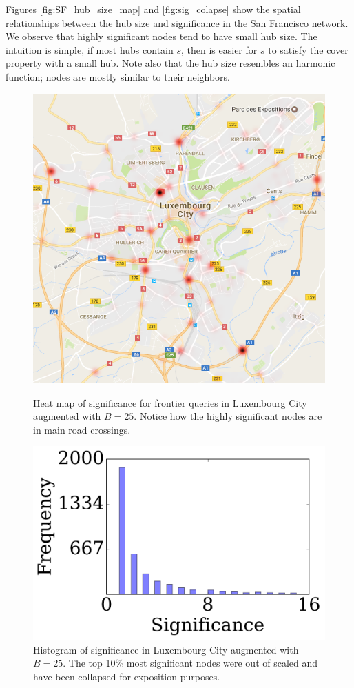 Figures \ref{fig:SF_hub_size_map} and \ref{fig:sig_colapse} show the spatial relationships between the hub size and significance in the San Francisco network. 
We observe that highly significant nodes tend to have small hub size.
The intuition is simple, if most hubs contain $s$, then is easier for $s$ to satisfy the cover property with a small hub.
Note also that the hub size resembles an harmonic function; nodes are mostly similar to their neighbors.

\begin{figure}
\begin{minipage}[t]{.53\textwidth}
\centering
\includegraphics[scale=0.3]{TexImg/map_LU_sig.png}
\caption{Heat map of significance for frontier queries in Luxembourg City augmented with $B=25$.
Notice how the highly significant nodes are in main road crossings.}
\label{fig:map_LU} 
\end{minipage}
\hfil
\begin{minipage}[t]{.43\textwidth}
\includegraphics[scale=0.35]{TexImg/significance_LU.pdf}
\caption{Histogram of significance in Luxembourg City augmented with $B=25$.
The top 10\% most significant nodes were out of scaled and have been collapsed for exposition purposes.}
\label{fig:sig_LU} 
\end{minipage}
\end{figure}